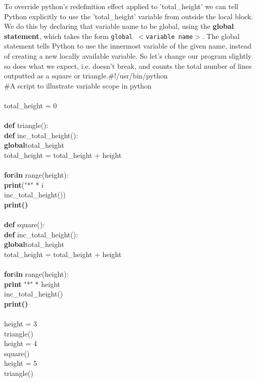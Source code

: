 To override python's redefinition effect applied to 'total\_height'   we can tell Python explicitly to use the 'total\_height' variable from   outside the local block. We do this by declaring that variable name to   be global, using the \textbf{global statement}, which takes the   form 
\texttt{global $<$variable name$>$}. The global statement   tells Python to use the innermost variable of the given name, instead   of creating a new locally available variable. So let's change our   program slightly so does what we expect, i.e. doesn't break, and counts   the total number of lines outputted as a square or triangle.\#!/usr/bin/python
\\    \#A script to illustrate variable scope in python
\\
\\total\_height = 0
\\
\\\textbf{def} triangle():
\\\textbf{def} inc\_total\_height():
\\\textbf{global}total\_height
\\total\_height = total\_height + height
\\
\\\textbf{for}i\textbf{in} range(height):
\\\textbf{print}("*" * i
\\ inc\_total\_height())
\\\textbf{print()}
\\
\\\textbf{def} square():
\\\textbf{def} inc\_total\_height():
\\\textbf{global}total\_height
\\total\_height = total\_height + height
\\
\\\textbf{for}i\textbf{in} range(height):
\\\textbf{print} "*" * height
\\ inc\_total\_height()
\\\textbf{print()}
\\
\\height = 3
\\    triangle()
\\height = 4
\\    square()
\\height = 5
\\    triangle()
\\
\\
